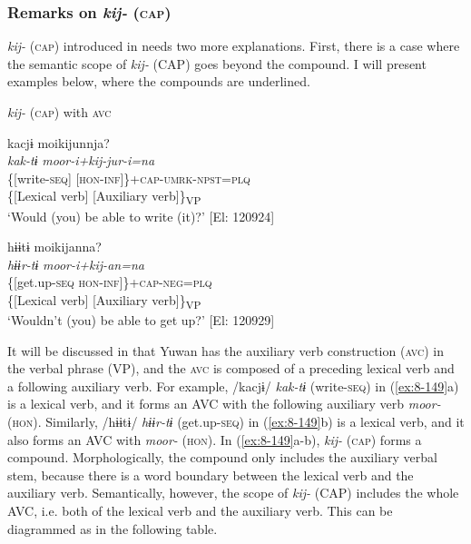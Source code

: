 \subsubsection{Remarks on \textit{kij-} (\textsc{cap})}

\textit{kij-} (\textsc{cap}) introduced in  needs two more explanations. First, there is a case where the semantic scope of \textit{kij-} (CAP) goes beyond the compound. I will present examples below, where the compounds are underlined.

\ea\label{ex:8-149}
  \textit{kij-} (\textsc{cap}) with \textsc{avc}

\ea
{\TM}
\gllll  kacjɨ  moikijunnja?\\
\textit{kak-tɨ}  \textit{moor-i+kij-jur-i=na}\\
\{[write-\textsc{seq}]  [\textsc{hon}-\textsc{inf}]\}+\textsc{cap}-\textsc{umrk}-\textsc{npst}=\textsc{plq}\\
      \{[Lexical verb]  [Auxiliary verb]\}\textsubscript{VP}\\
\glt ‘Would (you) be able to write (it)?’ [El: 120924]

\ex
{\TM}
\gllll  hɨɨtɨ  moikijanna?\\
\textit{hɨɨr-tɨ}  \textit{moor-i+kij-an=na}\\
\{[get.up-\textsc{seq}  \textsc{hon}-\textsc{inf}]\}+\textsc{cap}-\textsc{neg}=\textsc{plq}\\
      \{[Lexical verb]  [Auxiliary verb]\}\textsubscript{VP}\\
\glt ‘Wouldn’t (you) be able to get up?’ [El: 120929]
\z
\z

It will be discussed in  that Yuwan has the auxiliary verb construction (\textsc{avc}) in the verbal phrase (VP), and the \textsc{avc} is composed of a preceding lexical verb and a following auxiliary verb. For example, /kacjɨ/ \textit{kak-tɨ} (write-\textsc{seq}) in (\ref{ex:8-149}a) is a lexical verb, and it forms an AVC with the following auxiliary verb \textit{moor-} (\textsc{hon}). Similarly, /hɨɨtɨ/ \textit{hɨɨr-tɨ} (get.up-\textsc{seq}) in (\ref{ex:8-149}b) is a lexical verb, and it also forms an AVC with \textit{moor-} (\textsc{hon}). In (\ref{ex:8-149}a-b), \textit{kij-} (\textsc{cap}) forms a compound. Morphologically, the compound only includes the auxiliary verbal stem, because there is a word boundary between the lexical verb and the auxiliary verb. Semantically, however, the scope of \textit{kij-} (CAP) includes the whole AVC, i.e. both of the lexical verb and the auxiliary verb. This can be diagrammed as in the following table.

